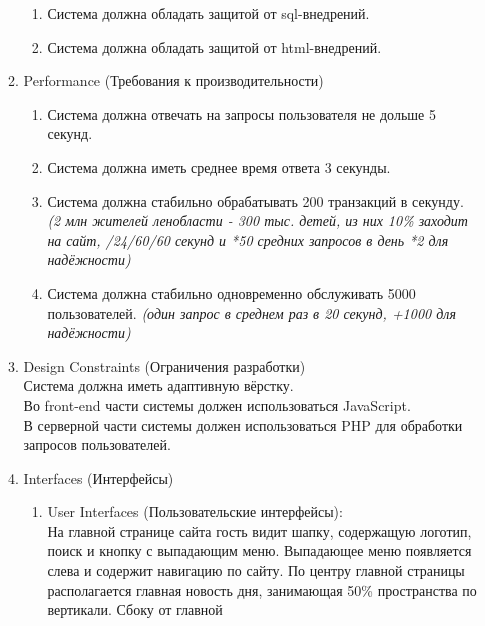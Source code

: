 \begin{enumerate}
\begin{enumerate}[label=3.\arabic*]
\begin{enumerate}[label=3.3.\arabic*]
            \item Система должна обладать защитой от sql-внедрений.
            \item Система должна обладать защитой от html-внедрений.
        \end{enumerate}
        \item Performance (Требования к производительности)
        \begin{enumerate}[label=3.4.\arabic*]
            \item Система должна отвечать на запросы пользователя не дольше 5 секунд.
            \item Система должна иметь среднее время ответа 3 секунды.
            \item Система должна стабильно обрабатывать 200 транзакций в секунду. \\
            \tiny \textit{(2 млн жителей ленобласти - 300 тыс. детей, из них 10\% заходит на сайт, /24/60/60 секунд и *50 средних запросов в день *2 для надёжности)}
            \normalsize
            \item Система должна стабильно одновременно обслуживать 5000 пользователей.
            \tiny \textit{(один запрос в среднем раз в 20 секунд, +1000 для надёжности)}
            \normalsize
        \end{enumerate}
        \item Design Constraints (Ограничения разработки) \\
        Система должна иметь адаптивную вёрстку. \\
        Во front-end части системы должен использоваться JavaScript. \\
        В серверной части системы должен использоваться PHP для обработки запросов пользователей.
        \item Interfaces (Интерфейсы)
        \BgThispage
        \begin{enumerate}[label=3.6.\arabic*]
            \item User Interfaces (Пользовательские интерфейсы): \\
            На главной странице сайта гость видит шапку, содержащую логотип, поиск и кнопку с выпадающим меню.
            Выпадающее меню появляется слева и содержит навигацию по сайту. По центру главной страницы
            располагается главная новость дня, занимающая 50\% пространства по вертикали. Сбоку от главной

\end{enumerate}
\end{enumerate}
\end{enumerate}
